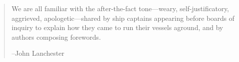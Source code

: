 \begin{quote}
\small\sf
We are all familiar with the after-the-fact tone---weary, self-justificatory, aggrieved, apologetic---shared by ship captains appearing before boards of inquiry to explain how they came to run their vessels aground, and by authors composing forewords.

--John Lanchester 
\bigskip

\end{quote}



\



